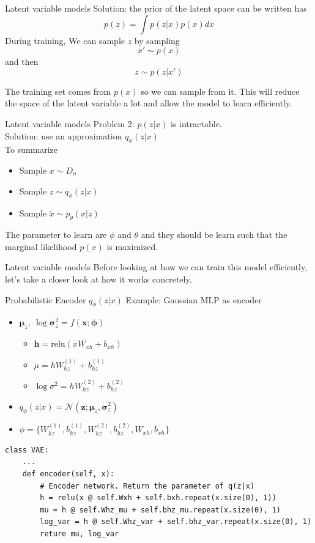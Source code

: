 \documentclass{beamer}
\newcommand{\relu}{\mathrm{relu}}
\begin{document}
\begin{frame}{Latent variable models}
	Solution: the prior of the latent space can be written has
	\[
	p(z) = \int p(z|x) p(x) dx
	\]
	During training, We can sample $z$ by sampling \\
	\[
	x'\sim p(x)
	\]
	and then 
	\[z\sim p(z|x')\]
	
	 The training set comes from $p(x)$ so we can sample from it. This will reduce the space of the latent variable a lot and allow the model to learn efficiently.
\end{frame}

\begin{frame}{Latent variable models}
	Problem 2: $p(z|x)$ is intractable. \\
	
	Solution: use an approximation $q_\phi(z|x)$\\
	
	To summarize
	\begin{itemize}
		\item Sample $x \sim D_n$
		\item Sample $z \sim q_\phi(z|x)$
		\item Sample $\tilde{x} \sim p_\theta(x|z)$
	\end{itemize}
	The parameter to learn are $\phi$ and $\theta$ and they should be learn such that the marginal likelihood $p(x)$ is maximized.
\end{frame}

\begin{frame}{Latent variable models}
	Before looking at how we can train this model efficiently, let's take a closer look at how it works concretely.
\end{frame}

\begin{frame}[fragile]{Probabilistic Encoder $q_\phi(z|x)$}
	Example: Gaussian MLP as encoder
	\begin{itemize}
		\item $\bm{\mu}_z,~\log\bm{\sigma}_z^2=f(\mathbf{x};\bm{\phi})$
		\begin{itemize}
			\item $\mathbf{h} = \relu\left(x W_{xh}+b_{xh}\right)$
			\item $\mu = h W^{(1)}_{hz}+b^{(1)}_{hz}$
			\item $\log \sigma^2 = h W^{(2)}_{hz}+b^{(2)}_{hz}$
		\end{itemize}
		\item $q_\phi(z|x)=\mathcal{N}(\mathbf{z};\bm{\mu}_z, \bm{\sigma}_z^2)$
		\item $\phi = \{W^{(1)}_{hz}, b^{(1)}_{hz}, W^{(2)}_{hz}, b^{(2)}_{hz}, W_{xh}, b_{xh}\}$
	\end{itemize}
\begin{verbatim}
class VAE:
    ...
    def encoder(self, x):
        # Encoder network. Return the parameter of q(z|x)
        h = relu(x @ self.Wxh + self.bxh.repeat(x.size(0), 1))  
        mu = h @ self.Whz_mu + self.bhz_mu.repeat(x.size(0), 1)      
        log_var = h @ self.Whz_var + self.bhz_var.repeat(x.size(0), 1)
        reture mu, log_var
\end{verbatim}
\end{frame}
\end{document}
